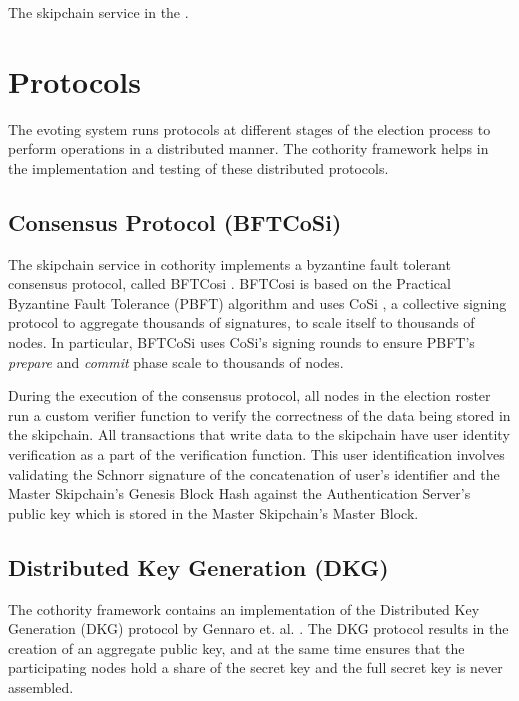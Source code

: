 The skipchain service in the .

\section{Protocols}

The evoting system runs protocols at different stages of the election process to perform operations in a distributed manner. The cothority framework helps in the implementation and testing of these distributed protocols.

\subsection{Consensus Protocol (BFTCoSi)}

The skipchain service in cothority implements a byzantine fault tolerant consensus protocol, called BFTCosi \cite{bftcosi} . BFTCosi is based on the Practical Byzantine Fault Tolerance (PBFT) \cite{pbft} algorithm and uses CoSi \cite{cosi}, a collective signing protocol to aggregate thousands of signatures, to scale itself to thousands of nodes. In particular, BFTCoSi uses CoSi's signing rounds to ensure PBFT's \textit{prepare} and \textit{commit} phase scale to thousands of nodes.

During the execution of the consensus protocol, all nodes in the election roster run a custom verifier function to verify the correctness of the data being stored in the skipchain. All transactions that write data to the skipchain have user identity verification as a part of the verification function. This user identification involves validating the  Schnorr signature of the concatenation of user's identifier and the Master Skipchain's Genesis Block Hash against the Authentication Server's public key which is stored in the Master Skipchain's Master Block.

\subsection{Distributed Key Generation (DKG)}
\label{sec:dkg}
The cothority framework contains an implementation of the Distributed Key Generation (DKG) protocol by Gennaro et. al. \cite{dkg}. The DKG protocol results in the creation of an aggregate public key, and at the same time ensures that the participating nodes hold a share of the secret key and the full secret key is never assembled.

